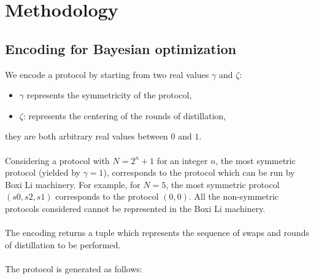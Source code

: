 \documentclass{article}
\begin{document}
\section*{Methodology}

\subsection*{Encoding for Bayesian optimization}

We encode a protocol by starting from two real values $\gamma$ and $\zeta$:
\begin{itemize}
    \item \(\gamma\) represents the symmetricity of the protocol,
    \item \(\zeta\): represents the centering of the rounds of distillation,
\end{itemize}
they are both arbitrary real values between $0$ and $1$.
\\\\
Considering a protocol with $N=2^n+1$ for an integer $n$, the most symmetric protocol (yielded by \(\gamma=1\)), corresponds to the protocol which can be run by Boxi Li machinery.
For example, for $N=5$, the most symmetric protocol $(s0, s2, s1)$ corresponds to the protocol $(0,0)$.
All the non-symmetric protocols considered cannot be represented in the Boxi Li machinery.
\\\\
The encoding returns a tuple which represents the sequence of swaps and rounds of distillation to be performed.
\\\\
The protocol is generated as follows:
\end{document}
